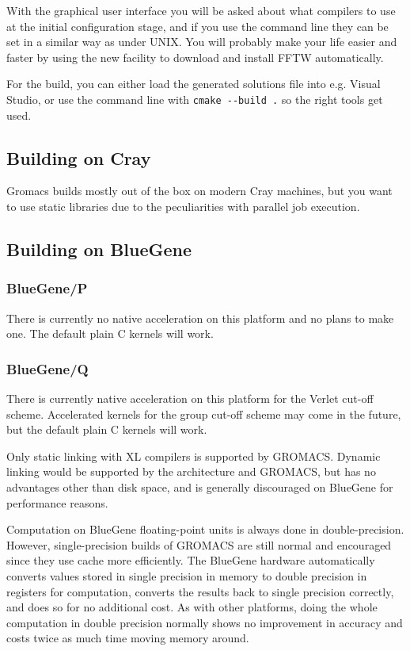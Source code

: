 \documentclass{article}[12pt,a4paper,twoside]
\newcommand{\gromacs}{GROMACS}
\newcommand{\fftw}{FFTW}
\begin{document}
With the graphical user interface you will be asked about what compilers
to use at the initial configuration stage, and if you use the command line
they can be set in a similar way as under UNIX.
You will probably make your life easier and faster by using the
new facility to download and install \fftw{} automatically. 

For the build, you can either load the generated solutions file into
e.g. Visual Studio, or use the command line with \verb+cmake --build .+ 
so the right tools get used.

\subsection{Building on Cray}

Gromacs builds mostly out of the box on modern Cray machines,
but you want to use static libraries due to the peculiarities with
parallel job execution.

\subsection{Building on BlueGene}

\subsubsection{BlueGene/P}

There is currently no native acceleration on this platform and no
plans to make one. The default plain C kernels will work.

\subsubsection{BlueGene/Q}

There is currently native acceleration on this platform for the Verlet
cut-off scheme. Accelerated kernels for the group cut-off scheme may
come in the future, but the default plain C kernels will work.

Only static linking with XL compilers is supported by \gromacs{}. Dynamic
linking would be supported by the architecture and \gromacs{}, but has no
advantages other than disk space, and is generally discouraged on
BlueGene for performance reasons.

Computation on BlueGene floating-point units is always done in
double-precision. However, single-precision builds of \gromacs{} are
still normal and encouraged since they use cache more efficiently. 
The BlueGene hardware automatically
converts values stored in single precision in memory to double
precision in registers for computation, converts the results back to
single precision correctly, and does so for no additional cost. As
with other platforms, doing the whole computation in double precision
normally shows no improvement in accuracy and costs twice as much time
moving memory around.
\end{document}
